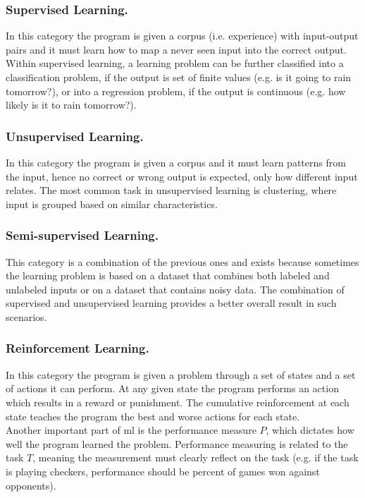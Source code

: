 \documentclass{llncs}
\begin{document}
\subsubsection{Supervised Learning.} In this category the program is given a corpus (i.e. experience) with input-output pairs and it must learn how to map a never seen input into the correct output. Within supervised learning, a learning problem can be further classified into a classification problem, if the output is set of finite values (e.g. is it going to rain tomorrow?), or into a regression problem, if the output is continuous (e.g. how likely is it to rain tomorrow?).

\subsubsection{Unsupervised Learning.} In this category the program is given a corpus and it must learn patterns from the input, hence no correct or wrong output is expected, only how different input relates. The most common task in unsupervised learning is clustering, where input is grouped based on similar characteristics.

\subsubsection{Semi-supervised Learning.} This category is a combination of the previous ones and exists because sometimes the learning problem is based on a dataset that combines both labeled and unlabeled inputs or on a dataset that contains noisy data. The combination of supervised and unsupervised learning provides a better overall result in such scenarios.

\subsubsection{Reinforcement Learning.} In this category the program is given a problem through a set of states and a set of actions it can perform. At any given state the program performs an action which results in a reward or punishment. The cumulative reinforcement at each state teaches the program the best and worse actions for each state.\\

Another important part of \gls{ml} is the performance measure $P$, which dictates how well the program learned the problem. Performance measuring is related to the task $T$, meaning the measurement must clearly reflect on the task (e.g. if the task is playing checkers, performance should be percent of games won against opponents).
\end{document}
